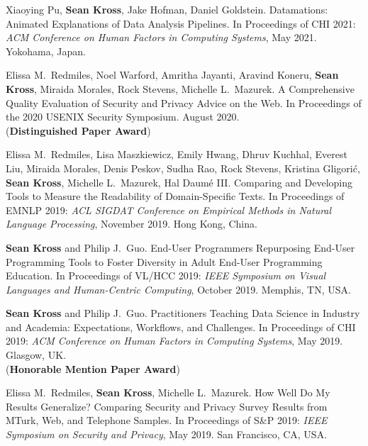 \begin{bibenum}
\item[C.11] Xiaoying Pu, \textbf{Sean Kross}, Jake Hofman, Daniel Goldstein. 
Datamations: Animated Explanations of Data Analysis Pipelines.
In Proceedings of CHI 2021: \emph{ACM Conference on Human Factors in Computing 
Systems}, May 2021. Yokohama, Japan.

\item[C.10] Elissa M.\ Redmiles, Noel Warford, Amritha Jayanti, Aravind Koneru,
\textbf{Sean Kross}, Miraida Morales, Rock Stevens, Michelle L.\ Mazurek.
A Comprehensive Quality Evaluation of Security and Privacy Advice on the Web. 
In Proceedings of the 2020 USENIX Security Symposium. August 2020.
\\ ({\textbf{Distinguished Paper Award}})

\item[C.9] Elissa M.\ Redmiles, Lisa Maszkiewicz, Emily Hwang, Dhruv Kuchhal,
Everest Liu, Miraida Morales, Denis Peskov, Sudha Rao, Rock Stevens, 
Kristina Gligorić, \textbf{Sean Kross}, Michelle L.\ Mazurek, Hal Daumé III.
Comparing and Developing Tools to Measure the Readability of Domain-Specific 
Texts. In Proceedings of EMNLP 2019: \emph{ACL SIGDAT Conference on Empirical 
Methods in Natural Language Processing}, November 2019. Hong Kong, China.

\item[C.8] \textbf{Sean Kross} and Philip J.\ Guo. End-User Programmers 
Repurposing End-User Programming Tools to Foster Diversity in Adult End-User 
Programming Education. In Proceedings of VL/HCC 2019: \emph{IEEE
Symposium on Visual Languages and Human-Centric Computing}, October 2019. 
Memphis, TN, USA.


\item[C.7] \textbf{Sean Kross} and Philip J.\ Guo. Practitioners Teaching Data 
Science in Industry and Academia: Expectations, Workflows, and Challenges.
In Proceedings of CHI 2019: \emph{ACM Conference on Human Factors in Computing 
Systems}, May 2019. Glasgow, UK. \\ ({\textbf{Honorable Mention Paper Award}})

\item[C.6] Elissa M.\ Redmiles, \textbf{Sean Kross}, Michelle L.\ Mazurek. 
How Well Do My Results Generalize? Comparing Security and Privacy Survey Results
from MTurk, Web, and Telephone Samples. In Proceedings of S\&P 2019: 
\emph{IEEE Symposium on Security and Privacy}, May 2019. San Francisco, CA, USA.


\end{bibenum}
